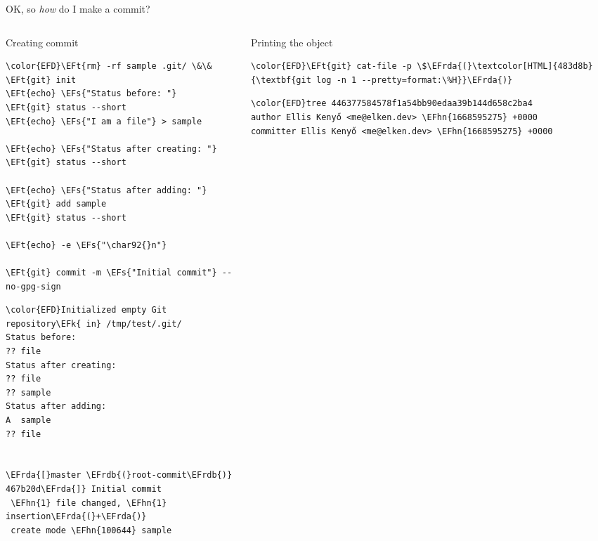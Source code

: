 \documentclass[presentation]{beamer}
\newcommand{\EFs}[1]{\textcolor{EFs}{#1}} %
\newcommand{\EFk}[1]{\textcolor{EFk}{#1}} %
\newcommand{\EFt}[1]{\textcolor{EFt}{#1}} %
\newcommand{\EFhn}[1]{\textcolor{EFhn}{\textbf{#1}}} %
\newcommand{\EFrda}[1]{\textcolor{EFrda}{#1}} %
\newcommand{\EFrdb}[1]{\textcolor{EFrdb}{#1}} %
\begin{document}
\begin{frame}[label={sec:org23842b3},fragile,shrink=40]{OK, so \emph{how} do I make a commit?}
 \begin{columns}
\begin{column}{0.9\columnwidth}
\begin{block}{Creating commit}
\begin{Code}
\begin{Verbatim}
\color{EFD}\EFt{rm} -rf sample .git/ \&\& \EFt{git} init
\EFt{echo} \EFs{"Status before: "}
\EFt{git} status --short
\EFt{echo} \EFs{"I am a file"} > sample

\EFt{echo} \EFs{"Status after creating: "}
\EFt{git} status --short

\EFt{echo} \EFs{"Status after adding: "}
\EFt{git} add sample
\EFt{git} status --short

\EFt{echo} -e \EFs{"\char92{}n"}

\EFt{git} commit -m \EFs{"Initial commit"} --no-gpg-sign
\end{Verbatim}
\end{Code}

\begin{Code}
\begin{Verbatim}
\color{EFD}Initialized empty Git repository\EFk{ in} /tmp/test/.git/
Status before: 
?? file
Status after creating: 
?? file
?? sample
Status after adding: 
A  sample
?? file


\EFrda{[}master \EFrdb{(}root-commit\EFrdb{)} 467b20d\EFrda{]} Initial commit
 \EFhn{1} file changed, \EFhn{1} insertion\EFrda{(}+\EFrda{)}
 create mode \EFhn{100644} sample
\end{Verbatim}
\end{Code}
\end{block}
\end{column}

\begin{column}{0.9\columnwidth}
\begin{block}{Printing the object}
\begin{Code}
\begin{Verbatim}
\color{EFD}\EFt{git} cat-file -p \$\EFrda{(}\textcolor[HTML]{483d8b}{\textbf{git log -n 1 --pretty=format:\%H}}\EFrda{)}
\end{Verbatim}
\end{Code}

\begin{Code}
\begin{Verbatim}
\color{EFD}tree 446377584578f1a54bb90edaa39b144d658c2ba4
author Ellis Kenyő <me@elken.dev> \EFhn{1668595275} +0000
committer Ellis Kenyő <me@elken.dev> \EFhn{1668595275} +0000


\end{Verbatim}
\end{Code}
\end{block}
\end{column}
\end{columns}
\end{frame}
\end{document}
